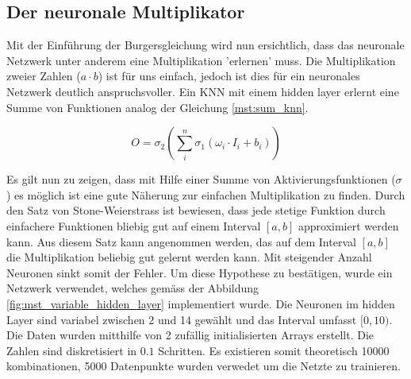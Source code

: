 \subsection{Der neuronale Multiplikator}
Mit der Einführung der Burgersgleichung wird nun ersichtlich, dass das neuronale Netzwerk unter anderem eine Multiplikation 'erlernen' muss. Die Multiplikation zweier Zahlen ($a \cdot b$) ist für uns einfach, jedoch ist dies für ein neuronales Netzwerk deutlich anspruchsvoller. Ein KNN mit einem hidden layer erlernt eine Summe von Funktionen analog der Gleichung \ref{mst:sum_knn}.

\begin{equation}
O = \sigma_{2} \left(\sum_{i}^{n}{\sigma_{1} (\omega_{i} \cdot I_{i} + b_i)} \right)
\label{eq:mst_sum_knn}
\end{equation}

Es gilt nun zu zeigen, dass mit Hilfe einer Summe von Aktivierungsfunktionen ($\sigma$) es möglich ist eine gute Näherung zur einfachen Multiplikation zu finden. Durch den Satz von Stone-Weierstrass ist bewiesen, dass jede stetige Funktion durch einfachere Funktionen bliebig gut auf einem Interval $[a, b]$ approximiert werden kann. Aus diesem Satz kann angenommen werden, das auf dem Interval $[a,b]$ die Multiplikation beliebig gut gelernt werden kann. Mit steigender Anzahl Neuronen sinkt somit der Fehler. Um diese Hypothese zu bestätigen, wurde ein Netzwerk verwendet, welches gemäss der Abbildung \ref{fig:mst_variable_hidden_layer} implementiert wurde. Die Neuronen im hidden Layer sind variabel zwischen 2 und 14 gewählt und das Interval umfasst $[0, 10)$. Die Daten wurden mitthilfe von 2 zufällig initialisierten Arrays erstellt. Die Zahlen sind diskretisiert in $0.1$ Schritten. Es existieren somit theoretisch 10000 kombinationen, 5000 Datenpunkte wurden verwedet um die Netzte zu trainieren.

